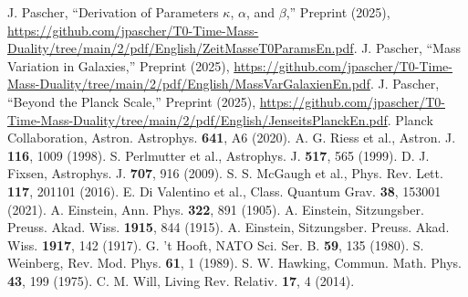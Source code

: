 \documentclass[twocolumn,aps,prl]{revtex4-2}
\begin{document}
\begin{thebibliography}{99}
		 J. Pascher, ``Derivation of Parameters $\kappa$, $\alpha$, and $\beta$,'' Preprint (2025), \url{https://github.com/jpascher/T0-Time-Mass-Duality/tree/main/2/pdf/English/ZeitMasseT0ParamsEn.pdf}.
		 J. Pascher, ``Mass Variation in Galaxies,'' Preprint (2025), \url{https://github.com/jpascher/T0-Time-Mass-Duality/tree/main/2/pdf/English/MassVarGalaxienEn.pdf}.
		 J. Pascher, ``Beyond the Planck Scale,'' Preprint (2025), \url{https://github.com/jpascher/T0-Time-Mass-Duality/tree/main/2/pdf/English/JenseitsPlanckEn.pdf}.
		 Planck Collaboration, Astron. Astrophys. \textbf{641}, A6 (2020).
		 A. G. Riess et al., Astron. J. \textbf{116}, 1009 (1998).
		 S. Perlmutter et al., Astrophys. J. \textbf{517}, 565 (1999).
		 D. J. Fixsen, Astrophys. J. \textbf{707}, 916 (2009).
		 S. S. McGaugh et al., Phys. Rev. Lett. \textbf{117}, 201101 (2016).
		 E. Di Valentino et al., Class. Quantum Grav. \textbf{38}, 153001 (2021).
		 A. Einstein, Ann. Phys. \textbf{322}, 891 (1905).
		 A. Einstein, Sitzungsber. Preuss. Akad. Wiss. \textbf{1915}, 844 (1915).
		 A. Einstein, Sitzungsber. Preuss. Akad. Wiss. \textbf{1917}, 142 (1917).
		 G. 't Hooft, NATO Sci. Ser. B. \textbf{59}, 135 (1980).
		 S. Weinberg, Rev. Mod. Phys. \textbf{61}, 1 (1989).
		 S. W. Hawking, Commun. Math. Phys. \textbf{43}, 199 (1975).
		 C. M. Will, Living Rev. Relativ. \textbf{17}, 4 (2014).
	\end{thebibliography}
	
\end{document}
